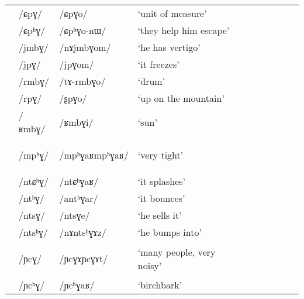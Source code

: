 \documentclass[oneside,a4paper,11pt]{article}
\newcommand{\ipa}[1]{\mbox{\phon/#1/}}
\newcommand{\deux}[1]{\ipa{#1}\addtocounter{2clusters}{1}}
\newcommand{\trois}[1]{\ipa{#1}\addtocounter{3clusters}{1}}
\newcommand{\idph}[1]{\cellcolor{gray}\textbf{#1}}
\newcommand{\resetcounters}[2]{
\newcounter{#1}
\newcounter{#2}
 \setcounter{#1}{\value{2clusters}}
  \setcounter{#2}{\value{3clusters}}
 \setcounter{2clusters}{0}
  \setcounter{3clusters}{0}
}
\begin{document}
\begin{table}
{\begin{tabular}{llllllllll}
\midrule    
&\deux{ɕpɣ} &\ipa{ɕpɣo} & `unit of measure' & & &\\
 &\trois{ɕpʰɣ} &\ipa{ɕpʰɣo-nɯ} & `they help him escape' & & &\\
\midrule      
 &\trois{jmbɣ} &\ipa{nɤjmbɣom} & `he has vertigo' & & &\\
 &\trois{jpɣ} &\ipa{jpɣom} & `it freezes' & & &\\
\midrule      
 &\trois{rmbɣ} &\ipa{tɤ-rmbɣo} & `drum' & & &\\
 &\trois{rpɣ} &\ipa{ʂpɣo} & `up on the mountain' & & &\\
\midrule      
 &\trois{ʁmbɣ} &\ipa{ʁmbɣi} & `sun' & & &\\
\midrule  
 &\trois{mpʰɣ}\idph{} &\ipa{mpʰɣaʁmpʰɣaʁ} & `very tight' & & &\\    
 &\trois{ntɕʰɣ} &\ipa{ntɕʰɣaʁ} & `it splashes' & & &\\
 &\trois{ntʰɣ} &\ipa{antʰɣar} & `it bounces' & & &\\
 &\trois{ntsɣ} &\ipa{ntsɣe} & `he sells it' & & &\\
 &\trois{ntsʰɣ} &\ipa{nɤntsʰɣɤz} & `he bumps into' & & &\\
 &\trois{ɲcɣ}\idph{} &\ipa{ɲcɣɤɲcɣɤt} & `many people, very noisy' & & &\\
 &\trois{ɲcʰɣ} &\ipa{ɲcʰɣaʁ} & `birchbark' & & &\\
 \bottomrule
\end{tabular}}
\end{table} 
\resetcounters{2Cg}{3Cg} %
\ADD{\value{2wszC}}{\value{2lrC}}{\totdeux}
\ADD{\totdeux}{\value{2jcC}}{\totdeux}
\ADD{\totdeux}{\value{2xgC}}{\totdeux}
\ADD{\totdeux}{\value{2nC}}{\totdeux}
\ADD{\totdeux}{\value{2Cjw}}{\totdeux}
\ADD{\totdeux}{\value{2Clr}}{\totdeux}
\ADD{\totdeux}{\value{2Cg}}{\totdeux}

 \ADD{\value{3wszC}}{\value{3lrC}}{\tottrois}
\ADD{\tottrois}{\value{3jcC}}{\tottrois}
\ADD{\tottrois}{\value{3xgC}}{\tottrois}
\ADD{\tottrois}{\value{3nC}}{\tottrois}
\ADD{\tottrois}{\value{3Cjw}}{\tottrois}
\ADD{\tottrois}{\value{3Clr}}{\tottrois}
\ADD{\tottrois}{\value{3Cg}}{\tottrois}
\end{document}
